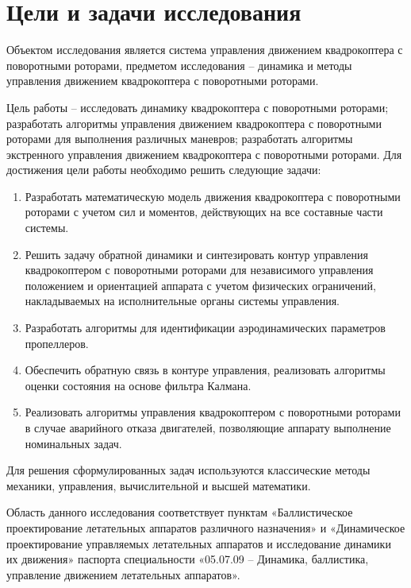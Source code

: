 \section{Цели и задачи исследования}

Объектом исследования является система управления движением квадрокоптера с поворотными роторами, предметом исследования -- динамика и методы управления движением квадрокоптера с поворотными роторами.

Цель работы -- исследовать динамику квадрокоптера с поворотными роторами;
разработать алгоритмы управления движением квадрокоптера с поворотными роторами для выполнения различных маневров;
разработать алгоритмы экстренного управления движением квадрокоптера с поворотными роторами.
Для достижения цели работы необходимо решить следующие задачи:
\begin{enumerate}
	\item Разработать математическую модель движения квадрокоптера с поворотными роторами с учетом сил и моментов, действующих на все составные части системы.
	\item Решить задачу обратной динамики и синтезировать контур управления квадрокоптером с поворотными роторами для независимого управления положением и ориентацией аппарата с учетом физических ограничений, накладываемых на исполнительные органы системы управления.
	\item Разработать алгоритмы для идентификации аэродинамических параметров пропеллеров.
	\item Обеспечить обратную связь в контуре управления, реализовать алгоритмы оценки состояния на основе фильтра Калмана.
	\item Реализовать алгоритмы управления квадрокоптером с поворотными роторами в случае аварийного отказа  двигателей, позволяющие аппарату выполнение номинальных задач.
\end{enumerate}
Для решения сформулированных задач используются классические методы механики, управления, вычислительной и высшей математики.

Область данного исследования соответствует пунктам «Баллистическое проектирование летательных аппаратов различного назначения» и «Динамическое проектирование управляемых летательных аппаратов и исследование динамики их движения» паспорта специальности «05.07.09 – Динамика, баллистика, управление движением летательных аппаратов».

